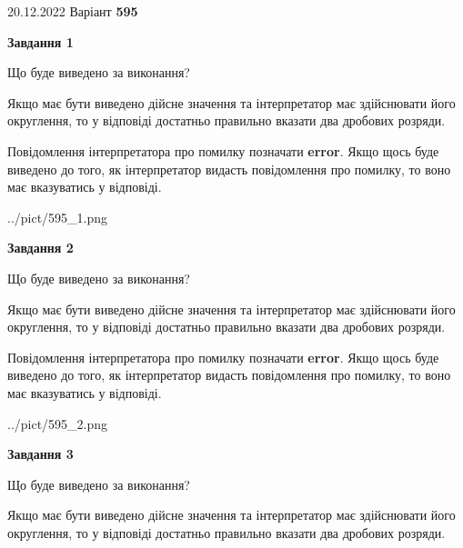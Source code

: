 \documentclass[12pt, ukrainian]{article}
\begin{document}
{20.12.2022 Варіант \No \textbf { 595 }\par}
{
\begin {Large}

{\begin {center}\textbf{Завдання 1}\end {center}}\par
Що буде виведено за виконання? \par

Якщо має бути виведено дійсне значення та інтерпретатор має здійснювати його округлення, 
то у відповіді достатньо правильно вказати два дробових розряди.

Повідомлення інтерпретатора про помилку позначати \textbf{error}.
Якщо щось буде виведено до того, як інтерпретатор видасть повідомлення про помилку, 
то воно має вказуватись у відповіді. \par

\begin{center}
	{../pict/595_1.png}
\end{center}
\newpage

{\begin {center}\textbf{Завдання 2}\end {center}}\par
Що буде виведено за виконання? \par

Якщо має бути виведено дійсне значення та інтерпретатор має здійснювати його округлення, 
то у відповіді достатньо правильно вказати два дробових розряди.

Повідомлення інтерпретатора про помилку позначати \textbf{error}.
Якщо щось буде виведено до того, як інтерпретатор видасть повідомлення про помилку, 
то воно має вказуватись у відповіді. \par

\begin{center}
	{../pict/595_2.png}
\end{center}
\newpage

{\begin {center}\textbf{Завдання 3}\end {center}}\par
Що буде виведено за виконання? \par

Якщо має бути виведено дійсне значення та інтерпретатор має здійснювати його округлення, 
то у відповіді достатньо правильно вказати два дробових розряди.


\end{Large}}
\end{document}
